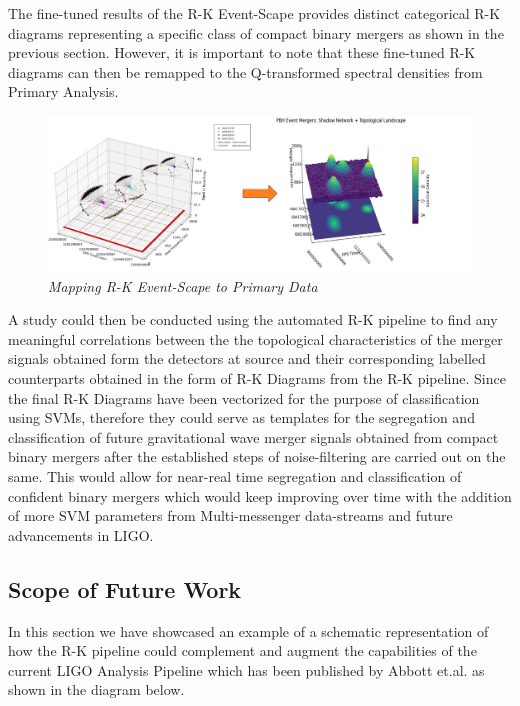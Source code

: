  The fine-tuned results of the R-K Event-Scape provides distinct categorical R-K diagrams representing a specific class of compact binary mergers as shown in the previous section. However, it is important to note that these fine-tuned R-K diagrams can then be remapped to the Q-transformed spectral densities from Primary Analysis.  
 
 \begin{figure}[H]
 	\centering
 	\includegraphics[width=1.0\linewidth]{images/76_Mapping R_K eventScape to Primary Data.jpg}
	\caption{\textit{Mapping R-K Event-Scape to Primary Data}}
 	\label{fig:LIGO17_PlaceHolder_fig}
 \end{figure}

A study could then be conducted using the automated R-K pipeline to find any meaningful correlations between the the topological characteristics of the merger signals obtained form the detectors at source and their corresponding labelled counterparts obtained in the form of R-K Diagrams from the R-K pipeline. Since the final R-K Diagrams have been vectorized for the purpose of classification using SVMs, therefore they could serve as templates for the segregation and classification of future gravitational wave merger signals  obtained from compact binary mergers after the established steps of noise-filtering are carried out on the same. This would allow for near-real time segregation and classification of confident binary mergers which would keep improving over time with the addition of more SVM parameters from Multi-messenger data-streams and future advancements in LIGO. 

 \subsection{Scope of Future Work}

In this section we have showcased an example of a schematic representation of how the R-K pipeline could complement and augment the capabilities of  the current LIGO Analysis Pipeline which has been published by Abbott et.al. \cite{00.6_LIGOAnalysisPipeline} as shown in the diagram below.

